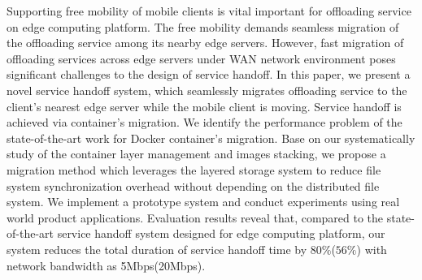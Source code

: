 
Supporting free mobility of mobile clients is vital important for offloading service on edge computing platform. The free mobility demands seamless migration of the offloading service among its nearby edge servers.
% 
However, fast migration of offloading services across edge servers under WAN network environment poses significant challenges to the design of service handoff. 
%
%
%
In this paper, we present a novel service handoff system, which seamlessly migrates offloading service to the client's nearest edge server while the mobile client is moving. 
Service handoff is achieved via container's migration. 
% 
We identify the performance problem of the state-of-the-art work for Docker container's migration.
%
Base on our systematically study of the container layer management and images stacking,
we propose a migration method which leverages the layered storage system to reduce file system synchronization overhead without depending on the distributed file system. 
We implement a prototype system and conduct experiments using real world product applications.
Evaluation results reveal that, compared to the state-of-the-art service handoff system designed for edge computing platform, our system reduces the total duration of service handoff time by 
$80\%$($56\%$) with network bandwidth as 5Mbps(20Mbps).







%
%
%

